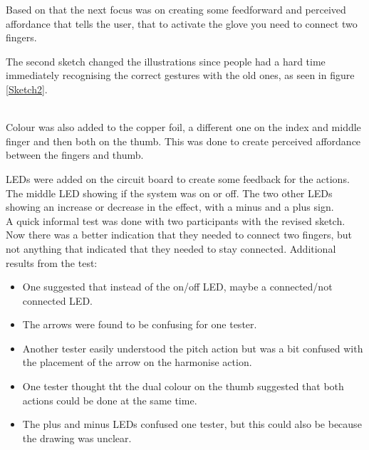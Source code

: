 Based on that the next focus was on creating some feedforward and perceived affordance that tells the user, that to activate the glove you need to connect two fingers.

The second sketch changed the illustrations since people had a hard time immediately recognising the correct gestures with the old ones, as seen in figure \ref{Sketch2}.\\

\begin{minipage}{\linewidth}%
\label{Sketch2}
\end{minipage}\\

Colour was also added to the copper foil, a different one on the index and middle finger and then both on the thumb. This was done to create perceived affordance between the fingers and thumb.

LEDs were added on the circuit board to create some feedback for the actions. The middle LED showing if the system was on or off. The two other LEDs showing an increase or decrease in the effect, with a minus and a plus sign.\\

A quick informal test was done with two participants with the revised sketch. Now there was a better indication that they needed to connect two fingers, but not anything that indicated that they needed to stay connected.
Additional results from the test:

\begin{itemize}
	\item One suggested that instead of the on/off LED, maybe a connected/not connected LED.
	\item The arrows were found to be confusing for one tester.
	\item Another tester easily understood the pitch action but was a bit confused with the placement of the arrow on the harmonise action.
	\item One tester thought tht the dual colour on the thumb suggested that both actions could be done at the same time.
	\item The plus and minus LEDs confused one tester, but this could also be because the drawing was unclear.
\end{itemize} 

